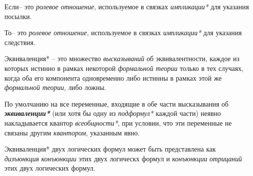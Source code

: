 
\begin{SCn}
\scnsubset{1\scnrolesign}
\end{SCn}

Если\scnrolesign -- это \textit{ролевое отношение}, используемое в связках \textit{импликации*} для указания посылки.

\begin{SCn}
\scnsubset{2\scnrolesign}
\end{SCn}

То\scnrolesign -- это \textit{ролевое отношение}, используемое в связках \textit{импликации*} для указания следствия.

\begin{SCn}
\end{SCn}

Эквиваленция* -- это множество \textit{высказываний} об эквивалентности, каждое из которых истинно в рамках некоторой \textit{формальной теории} только в тех случаях, когда оба его компонента одновременно либо истинны в рамках этой же \textit{формальной теории}, либо ложны.

По умолчанию на все переменные, входящие в обе части высказывания об \textbf{\textit{эквиваленции*}} (или хотя бы одну из \textit{подформул*} каждой части) неявно накладывается квантор \textit{всеобщности*}, при условии, что эти переменные не связаны другим \textit{квантором}, указанным явно.

Эквиваленция* двух логических формул может быть представлена как \textit{дизъюнкция} \textit{конъюнкции} этих двух логическх формул и \textit{конъюнкции} \textit{отрицаний} этих двух логических формул.

\begin{SCn}
\end{SCn}

